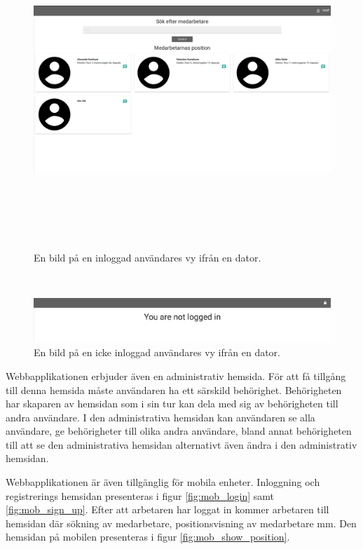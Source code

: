 \documentclass[swedish, a4paper,12pt]{article}
\begin{document}
\begin{figure}[H]
  \centering
  \includegraphics[width=14cm, height=12cm]{media/comp_show_position.png}
  \caption{En bild på en inloggad användares vy ifrån en dator.}
  \label{fig:comp_show_position}
\end{figure}
\leavevmode\\

\begin{figure}[H]
  \centering
  \includegraphics[width=14cm]{media/comp_not_logged_in.png}
  \caption{En bild på en icke inloggad användares vy ifrån en dator.}
  \label{fig:comp_not_logged_in}
\end{figure}

Webbapplikationen erbjuder även en administrativ hemsida. För att få tillgång till denna hemsida måste användaren ha ett särskild behörighet. Behörigheten har skaparen av hemsidan som i sin tur kan dela med sig av behörigheten till andra användare. I den administrativa hemsidan kan användaren se alla användare, ge behörigheter till olika andra användare, bland annat behörigheten till att se den administrativa hemsidan alternativt även ändra i den administrativ hemsidan.

Webbapplikationen är även tillgänglig för mobila enheter. Inloggning och registrerings hemsidan presenteras i figur \ref{fig:mob_login} samt \ref{fig:mob_sign_up}. Efter att arbetaren har loggat in kommer arbetaren till hemsidan där sökning av medarbetare, positionsvisning av medarbetare mm. Den hemsidan på mobilen presenteras i figur \ref{fig:mob_show_position}.
\end{document}
